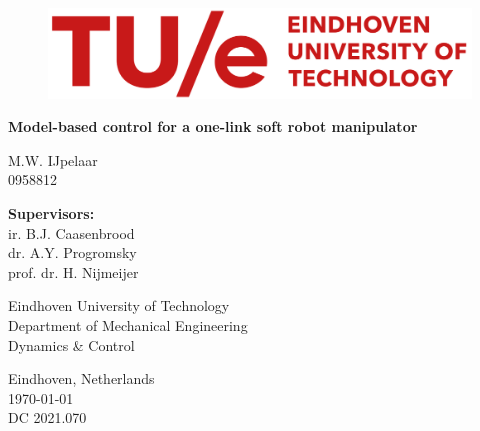 
\begin{titlepage}
\vspace*{10mm}

          \begin{figure}[H]
                \centering
              \includegraphics[width=0.7\linewidth]{TitlePage/TUe-logo-descriptor-line-scarlet-L.png}
          \end{figure}

\begin{center}


\vspace*{15mm}

    \Huge
    \textbf{Model-based control for a one-link soft robot manipulator\\}
    
\vspace*{10mm}   
    \Large
    {M.W. IJpelaar} \\
    {0958812}
    
    
\vspace*{2.5cm}
\large
 \textbf{Supervisors:}   \\
    ir. B.J. Caasenbrood   \\
    dr. A.Y. Progromsky  \\
    prof. dr. H. Nijmeijer   \\

\vspace*{25mm}

\end{center}

\begin{flushleft}
Eindhoven University of Technology \\
Department of Mechanical Engineering \\
Dynamics \& Control
 
 
\vspace*{5mm} 


Eindhoven, Netherlands\\
\today \\
DC 2021.070
\end{flushleft}
	
	
\end{titlepage}